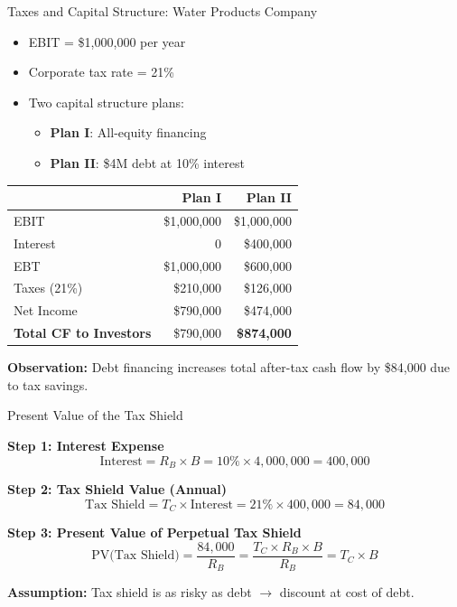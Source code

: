 \begin{frame}{Taxes and Capital Structure: Water Products Company}
	\begin{itemize}
		\item EBIT = \$1,000,000 per year
		\item Corporate tax rate = 21\%
		\item Two capital structure plans:
		\begin{itemize}
			\item \textbf{Plan I}: All-equity financing
			\item \textbf{Plan II}: \$4M debt at 10\% interest
		\end{itemize}
	\end{itemize}
	
	\begin{table}
		\centering
		\begin{tabular}{@{}lrr@{}}
			\toprule
			& \textbf{Plan I} & \textbf{Plan II} \\ \midrule
			EBIT              & \$1,000,000     & \$1,000,000      \\
			Interest          & 0               & \$400,000        \\
			EBT               & \$1,000,000     & \$600,000        \\
			Taxes (21\%)      & \$210,000       & \$126,000        \\
			Net Income        & \$790,000       & \$474,000        \\
			\textbf{Total CF to Investors} & \$790,000       & \textbf{\$874,000} \\ \bottomrule
		\end{tabular}
	\end{table}
	
	\textbf{Observation:} Debt financing increases total after-tax cash flow by \$84,000 due to tax savings.
\end{frame}

\begin{frame}{Present Value of the Tax Shield}
	
	\textbf{Step 1: Interest Expense}
	\[
	\text{Interest} = R_B \times B = 10\% \times 4{,}000{,}000 = 400{,}000
	\]
	
	\textbf{Step 2: Tax Shield Value (Annual)}
	\[
	\text{Tax Shield} = T_C \times \text{Interest} = 21\% \times 400{,}000 = 84{,}000
	\]
	
	\textbf{Step 3: Present Value of Perpetual Tax Shield}
	\[
	\text{PV(Tax Shield)} = \frac{84{,}000}{R_B} = \frac{T_C \times R_B \times B}{R_B} = T_C \times B
	\]
	
	\vspace{0.3cm}
	\textbf{Assumption:}  
	Tax shield is as risky as debt $\rightarrow$ discount at cost of debt.
	
\end{frame}

